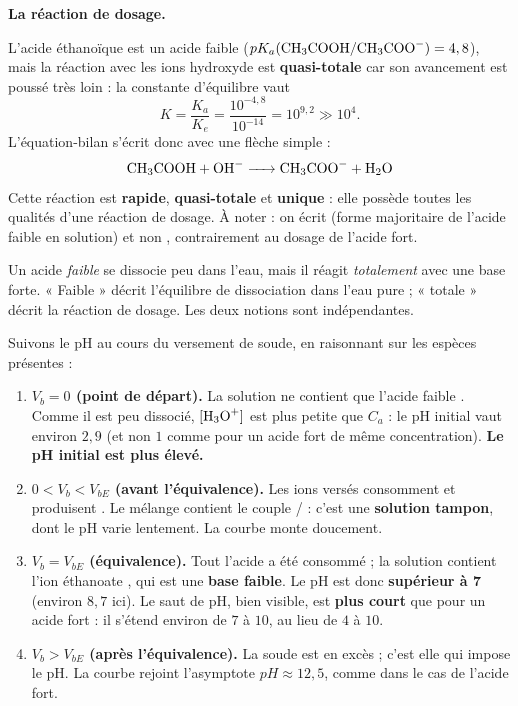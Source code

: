 \documentclass[11pt]{article}
\newcounter{popsec}
\newcounter{popsub}
\newcommand{\courssub}[1]{%
  \stepcounter{popsub}%
  \par\vspace{9pt}\noindent{\popxbold\fontsize{11.5}{13}\selectfont\color{popink}{\color{poporange}\thepopsec.\thepopsub}\hspace{6pt}#1}\par\nopagebreak\vspace{4pt}
}
\begin{document}
\textbf{La réaction de dosage.}\par
L'acide éthanoïque est un acide faible ($pK_a(\ce{CH3COOH}/\ce{CH3COO-}) = 4,8$), mais la réaction avec les ions hydroxyde est \textbf{quasi-totale} car son avancement est poussé très loin : la constante d'équilibre vaut
\[
K = \frac{K_a}{K_e} = \frac{10^{-4,8}}{10^{-14}} = 10^{9,2} \gg 10^4 .
\]
L'équation-bilan s'écrit donc avec une flèche simple :
\[
\ce{CH3COOH + OH- -> CH3COO- + H2O}
\]
Cette réaction est \textbf{rapide}, \textbf{quasi-totale} et \textbf{unique} : elle possède toutes les qualités d'une réaction de dosage. À noter : on écrit  (forme majoritaire de l'acide faible en solution) et non , contrairement au dosage de l'acide fort.

\begin{attention}
Un acide \emph{faible} se dissocie peu dans l'eau, mais il réagit \emph{totalement} avec une base forte. « Faible » décrit l'équilibre de dissociation dans l'eau pure ; « totale » décrit la réaction de dosage. Les deux notions sont indépendantes.
\end{attention}

\courssub{Allure de la courbe $pH = f(V_b)$}

Suivons le pH au cours du versement de soude, en raisonnant sur les espèces présentes :

\begin{enumerate}
\item \textbf{$V_b = 0$ (point de départ).} La solution ne contient que l'acide faible . Comme il est peu dissocié, $[\ce{H3O+}]$ est plus petite que $C_a$ : le pH initial vaut environ $2,9$ (et non $1$ comme pour un acide fort de même concentration). \textbf{Le pH initial est plus élevé.}
\item \textbf{$0 < V_b < V_{bE}$ (avant l'équivalence).} Les ions  versés consomment  et produisent . Le mélange contient le couple / : c'est une \textbf{solution tampon}, dont le pH varie lentement. La courbe monte doucement.
\item \textbf{$V_b = V_{bE}$ (équivalence).} Tout l'acide a été consommé ; la solution contient l'ion éthanoate , qui est une \textbf{base faible}. Le pH est donc \textbf{supérieur à 7} (environ $8,7$ ici). Le saut de pH, bien visible, est \textbf{plus court} que pour un acide fort : il s'étend environ de $7$ à $10$, au lieu de $4$ à $10$.
\item \textbf{$V_b > V_{bE}$ (après l'équivalence).} La soude est en excès ; c'est elle qui impose le pH. La courbe rejoint l'asymptote $pH \approx 12,5$, comme dans le cas de l'acide fort.
\end{enumerate}
\end{document}
